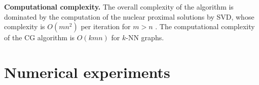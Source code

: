 \documentclass{article}
\begin{document}
{\bf Computational complexity.} The overall complexity of the algorithm is dominated by the computation of the nuclear proximal solutions by SVD, whose complexity is $O(mn^2)$
per iteration for $m>n$ \cite{golub2012matrix}. The computational complexity of the CG algorithm is $O(kmn)$
for $k$-NN graphs.








































\vspace{-0.05cm}
\section{Numerical experiments}
\vspace{-0.15cm}
\end{document}
